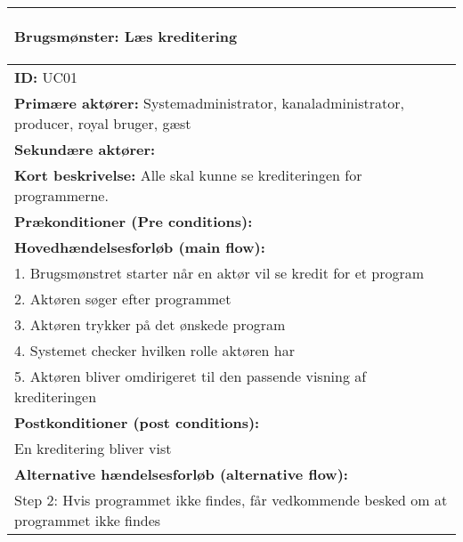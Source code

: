 \begin{table}[H]
\begin{tabular}{|p{14cm}|}
\hline
    \begin{center}{}
    \textbf{Brugsmønster:}  Læs kreditering  
    \end{center} \\ \hline
    
	\textbf{ID:} UC01 \\ \hline
	\textbf{Primære aktører:} Systemadministrator, kanaladministrator, producer, royal bruger, gæst \\ \hline
	\textbf{Sekundære aktører:} \\ \hline
	\textbf{Kort beskrivelse:} Alle skal kunne se krediteringen for programmerne. \\ \hline
	\textbf{Prækonditioner (Pre conditions):} \\ \hline
\textbf{Hovedhændelsesforløb (main flow):} \\
1. Brugsmønstret starter når en aktør vil se kredit for et program \\
2. Aktøren søger efter programmet \\
3. Aktøren trykker på det ønskede program \\
4. Systemet checker hvilken rolle aktøren har \\
5. Aktøren bliver omdirigeret til den passende visning af krediteringen \\ \hline
    \textbf{	Postkonditioner (post conditions):} \\
    En kreditering bliver vist \\ \hline

	\textbf{Alternative hændelsesforløb (alternative flow):} \\
Step 2: Hvis programmet ikke findes, får vedkommende besked om at programmet ikke findes 
\\ \hline
\end{tabular}{}
\end{table}
